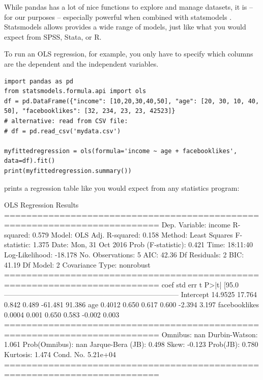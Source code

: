 \documentclass[a4paper,12pt]{book}
\begin{document}
While pandas has a lot of nice functions to explore and manage datasets, it is -- for our purposes -- especially powerful when combined with statsmodels \citep{statsmodels}. Statsmodels allows provides a wide range of models, just like what you would expect from SPSS, Stata, or R.

To run an OLS regression, for example, you only have to specify which columns are the dependent and the independent variables. 

\begin{lstlisting}
import pandas as pd
from statsmodels.formula.api import ols
df = pd.DataFrame({"income": [10,20,30,40,50], "age": [20, 30, 10, 40, 50], "facebooklikes": [32, 234, 23, 23, 42523]}
# alternative: read from CSV file:
# df = pd.read_csv('mydata.csv')

myfittedregression = ols(formula='income ~ age + facebooklikes', data=df).fit()
print(myfittedregression.summary())

\end{lstlisting}
prints a regression table like you would expect from any statistics program:

\begin{lstlistingoutput}
OLS Regression Results                            
==========================================================================
Dep. Variable:                 income   R-squared:                       0.579
Model:                            OLS   Adj. R-squared:                  0.158
Method:                 Least Squares   F-statistic:                     1.375
Date:                Mon, 31 Oct 2016   Prob (F-statistic):              0.421
Time:                        18:11:40   Log-Likelihood:                -18.178
No. Observations:                   5   AIC:                             42.36
Df Residuals:                       2   BIC:                             41.19
Df Model:                           2                                         
Covariance Type:            nonrobust                                         
==========================================================================
coef    std err          t      P>|t|      [95.0%
--------------------------------------------------------------------------
Intercept        14.9525     17.764      0.842      0.489       -61.481    91.386
age               0.4012      0.650      0.617      0.600        -2.394     3.197
facebooklikes     0.0004      0.001      0.650      0.583        -0.002     0.003
==========================================================================
Omnibus:                          nan   Durbin-Watson:                   1.061
Prob(Omnibus):                    nan   Jarque-Bera (JB):                0.498
Skew:                          -0.123   Prob(JB):                        0.780
Kurtosis:                       1.474   Cond. No.                     5.21e+04
==========================================================================
\end{lstlistingoutput}
\end{document}
